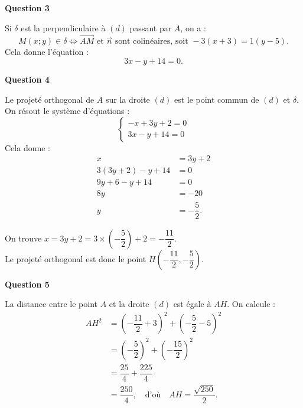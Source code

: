 	\textbf{Question 3}
	
	Si $\delta$ est la perpendiculaire à $(d)$ passant par $A$, on a :
	\[
	M(x; y) \in \delta \iff \overrightarrow{AM} \text{ et } \vec{n} \text{ sont colinéaires, soit } -3(x + 3) = 1(y - 5).
	\]
	Cela donne l'équation :
	\[
	3x - y + 14 = 0.
	\]
	
\textbf{Question 4}

Le projeté orthogonal de $A$ sur la droite $(d)$ est le point commun de $(d)$ et $\delta$. On résout le système d'équations :
\[
\begin{cases}
	-x + 3y + 2 = 0 \\
	3x - y + 14 = 0
\end{cases}
\]
Cela donne :
\begin{align*}
	x &= 3y + 2 \\
	3(3y + 2) - y + 14 &= 0 \\
	9y + 6 - y + 14 &= 0 \\
	8y &= -20 \\
	y &= -\dfrac{5}{2}.
\end{align*}

On trouve $x = 3y + 2 = 3 \times \left(-\dfrac{5}{2}\right) + 2 = -\dfrac{11}{2}$.\\
 Le projeté orthogonal est donc le point $H\left(-\dfrac{11}{2}, -\dfrac{5}{2}\right)$.

\textbf{Question 5}

La distance entre le point $A$ et la droite $(d)$ est égale à $AH$. On calcule :
\begin{align*}
	AH^2 &= \left(-\dfrac{11}{2} + 3\right)^2 + \left(-\dfrac{5}{2} - 5\right)^2 \\
	&= \left(-\dfrac{5}{2}\right)^2 + \left(-\dfrac{15}{2}\right)^2 \\
	&= \dfrac{25}{4} + \dfrac{225}{4} \\
	&= \dfrac{250}{4}, \quad \text{d'où} \quad AH = \dfrac{\sqrt{250}}{2}.
\end{align*}
